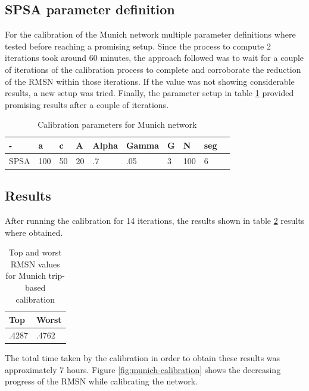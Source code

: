 \subsection{SPSA parameter definition}
For the calibration of the Munich network multiple parameter definitions where tested before reaching a promising setup. Since the process to compute 2 iterations took around 60 minutes, the approach followed was to wait for a couple of iterations of the calibration process to complete and corroborate the reduction of the RMSN within those iterations. If the value was not showing considerable results, a new setup was tried. Finally, the parameter setup in table \ref{tab:calibration-params-munich} provided promising results after a couple of iterations.

\begin{table}[htpb]
  \centering
  \begin{tabular}{l l l l l l l l l l}
    \toprule
      - & a & c & A & Alpha & Gamma & G & N & seg\\
    \midrule
      SPSA & 100 & 50 & 20 & .7 & .05 & 3 & 100 & 6 \\
    \bottomrule
  \end{tabular}
  \caption[Calibration Parameters Munich]{Calibration parameters for Munich network}
  \label{tab:calibration-params-munich}
\end{table}

\subsection{Results}
After running the calibration for 14 iterations, the results shown in table \ref{tab:top-rmsn-mu-trip} results where obtained.

\begin{table}[htpb]
  \centering
  \begin{tabular}{l l}
    \toprule
      Top & Worst \\
    \midrule
      .4287 & .4762 \\
    \bottomrule
  \end{tabular}
  \caption[Top Worst 3 RMSN MUC Trip]{Top and worst RMSN values for Munich trip-based calibration}
  \label{tab:top-rmsn-mu-trip}
\end{table}

The total time taken by the calibration in order to obtain these results was approximately 7 hours. Figure \ref{fig:munich-calibration} shows the decreasing progress of the RMSN while calibrating the network. 

